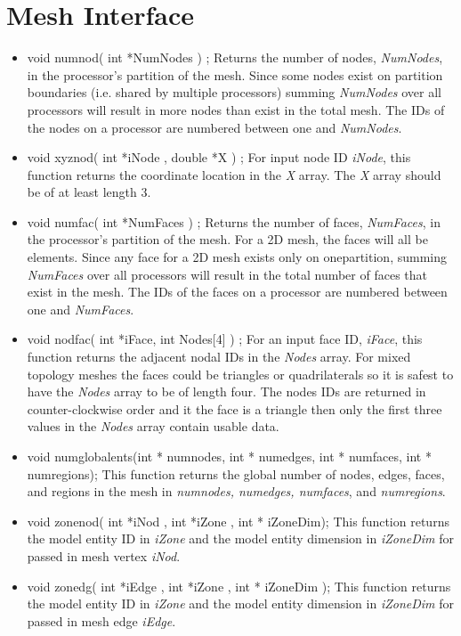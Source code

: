\section{Mesh Interface}
\begin{itemize}
\item void numnod( int *NumNodes ) ; Returns the number of nodes, \textit{NumNodes}, in the processor's partition of the mesh.  Since
 some nodes  exist on partition boundaries (i.e. shared by multiple processors) summing \textit{NumNodes} over all
processors will result in more nodes than exist in the total mesh. The IDs of the nodes on a processor are numbered between
one and \textit{NumNodes}.
\item void xyznod( int *iNode , double *X ) ; For input node ID \textit{iNode}, this function returns the coordinate location in 
the \textit{X} array.  The \textit{X} array should be of at least length 3.
\item void numfac( int *NumFaces ) ; Returns the number of faces, \textit{NumFaces}, in the processor's partition of the mesh. 
For a 2D mesh, the faces will all be elements. Since
 any face for a 2D mesh  exists only on  onepartition,  summing \textit{NumFaces} over all
processors will result in the total number of faces that exist in the mesh. The IDs of the faces on a processor are numbered between
one and \textit{NumFaces}.
\item void nodfac( int *iFace, int Nodes[4] ) ; For an input face ID, \textit{iFace}, this function returns the adjacent nodal IDs
in the \textit{Nodes} array.  
For mixed topology meshes the faces could be triangles or quadrilaterals so it is safest to have the \textit{Nodes} array to be of
length four.  The nodes IDs are returned in counter-clockwise order and it the face is a triangle then only the first three
values in the \textit{Nodes} array contain usable data.
\item void numglobalents(int * numnodes, int * numedges, int * numfaces, int * numregions); This function returns
the global number of nodes, edges, faces, and regions in the mesh in \textit{numnodes, numedges, numfaces}, and \textit{numregions}.
\item  void zonenod( int *iNod , int *iZone , int * iZoneDim); This function returns the model entity ID in 
\textit{iZone} and the model entity dimension in \textit{iZoneDim} for passed in mesh vertex \textit{iNod}.
\item void zonedg( int *iEdge , int *iZone , int * iZoneDim ); This function returns the model entity ID in 
\textit{iZone} and the model entity dimension in \textit{iZoneDim} for passed in mesh edge \textit{iEdge}.


\end{itemize}
